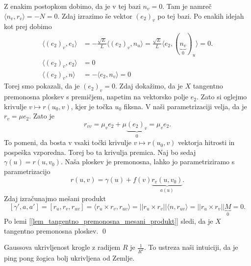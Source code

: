 Z enakim postopkom dobimo, da je v tej bazi $n_v = 0$. Tam je namreč $\langle n_v, r_v \rangle = - N = 0.$
Zdaj izrazimo še vektor $(e_2)_v$ po tej bazi. Po enakih idejah kot prej dobimo \begin{align*}
  \langle (e_2)_v, e_1 \rangle &=  -\frac{\sqrt{E} }{L} \langle (e_2)_v, n_u \rangle = \frac{\sqrt{E}}{L} \langle e_2, (\underbrace{n_v}_0)_u \rangle = 0.  \\
  \langle (e_2)_v, e_2 \rangle   &= 0 \\
  \langle (e_2)_v, n \rangle &= - \langle e_2, n_v \rangle = 0   
\end{align*}
Torej smo pokazali, da je $(e_2)_v = 0$. Zdaj dokažimo, da je $X$ tangentno premonosna ploskev s premičjem, napetim
na vektorsko polje $e_2$. Zato si oglejmo krivulje $v \mapsto r(u_0, v)$, kjer je točka $u_0$ fiksna. V naši parametrizaciji velja,
da je $r_v = \mu e_2$. Zato je \begin{equation*}
r_{vv} = \mu_v e_2 + \mu \underbrace{ (e_2)_v}_0  = \mu_v e_2.
\end{equation*}  
To pomeni, da bosta v vsaki točki krivulje $v \mapsto r(u_0, v)$ vektorja hitrosti in pospeška vzporedna. Torej bo ta krivulja premica. Naj bo sedaj
$\gamma(u) = r(u, v_0)$. Naša ploskev je premonosna, lahko jo parametriziramo s parametrizacijo \begin{equation*}
r(u,v) = \gamma(u) + f(v) \underbrace{r_v(u, v_0)}_{a(u)}. 
\end{equation*}  
Zdaj izračunajmo mešani produkt \begin{equation*}
\left[ \gamma', a , a' \right] = \left[ r_u, r_v, r_{uv} \right]
= \langle r_u \times  r_v, r_{uv} \rangle = \lvert\lvert r_u \times  r_v \rvert\rvert \langle n, r_{uv} \rangle
= \lvert\lvert r_u \times r_v \rvert\rvert \underbrace{M}_0  = 0.
\end{equation*}  
Po lemi [\ref{lem_tangentno_premonosna_mesani_produkt}] sledi, da je $X$ tangentno premonosna ploskev.
\qed

\begin{opomba}
Gaussova ukrivljenost krogle z radijem $R$ je $\frac{1}{R^2}$. To ustreza naši intuiciji, da je ping pong žogica bolj ukrivljena od Zemlje.
\end{opomba}